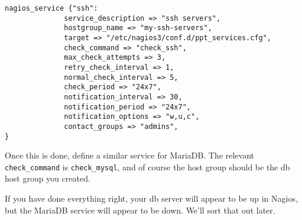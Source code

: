 \documentclass{article}         %
\begin{document}
\begin{verbatim}
nagios_service {"ssh":
              service_description => "ssh servers",
              hostgroup_name => "my-ssh-servers",
              target => "/etc/nagios3/conf.d/ppt_services.cfg",
              check_command => "check_ssh",
              max_check_attempts => 3,
              retry_check_interval => 1,
              normal_check_interval => 5,
              check_period => "24x7",
              notification_interval => 30,
              notification_period => "24x7",
              notification_options => "w,u,c",
              contact_groups => "admins",
}

\end{verbatim}

Once this is done, define a similar service for MariaDB. The relevant \texttt{check\_command} is \texttt{check\_mysql}, and of course the host group should be the db host group you created.


If you have done everything right, your db server will appear to be up in Nagios,
but the MariaDB service will appear to be down. We'll sort that out later.
\end{document}
